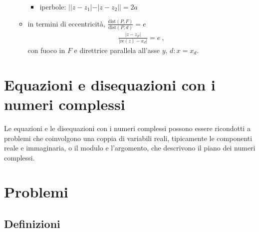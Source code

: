 \documentclass[letterpaper,10pt,italian]{jupyterBook}
\begin{document}
\begin{itemize}
\begin{itemize}
\begin{itemize}
\item {} 
\sphinxAtStartPar
iperbole:      \(||z-z_1| - |z-z_2|| = 2a\)

\end{itemize}

\item {} 
\sphinxAtStartPar
in termini di eccentricità, \(\frac{\text{dist}(P,F)}{\text{dist}(P,d)} = e\)
\begin{equation*}
\begin{split}\frac{|z - z_F|}{|\text{re}(z) - x_d|} = e \ ,\end{split}
\end{equation*}
\sphinxAtStartPar
con fuoco in \(F\) e direttrice parallela all’asse \(y\), \(d: x = x_d\).

\end{itemize}

\end{itemize}

\sphinxAtStartPar
{} 


\section{Equazioni e disequazioni con i numeri complessi}
\label{\detokenize{ch/algebra/complex-algebra:equazioni-e-disequazioni-con-i-numeri-complessi}}\label{\detokenize{ch/algebra/complex-algebra:math-hs-algebra-complex-equations}}
\sphinxAtStartPar
Le equazioni e le disequazioni con i numeri complessi possono essere ricondotti a problemi che coinvolgono una coppia di variabili reali, tipicamente le componenti reale e immaginaria, o il modulo e l’argomento, che descrivono il piano dei numeri complessi.

\sphinxAtStartPar
{}

\sphinxstepscope


\section{Problemi}
\label{\detokenize{ch/algebra/complex-algebra-problems:problemi}}\label{\detokenize{ch/algebra/complex-algebra-problems:math-hs-algebra-complex-problems}}\label{\detokenize{ch/algebra/complex-algebra-problems::doc}}

\subsection{Definizioni}
\label{\detokenize{ch/algebra/complex-algebra-problems:definizioni}}\label{\detokenize{ch/algebra/complex-algebra-problems:math-hs-algebra-complex-problems-def}}
\sphinxAtStartPar
{}
\end{document}
